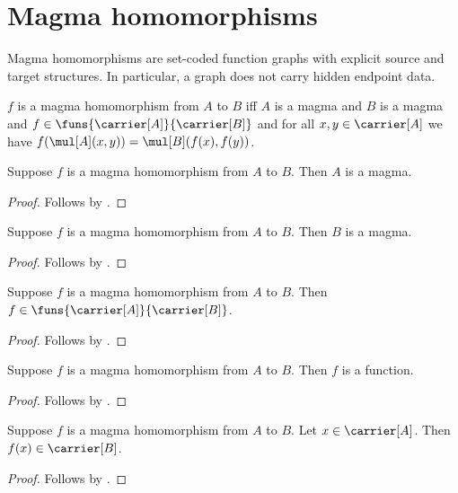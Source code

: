 

\section{Magma homomorphisms}

Magma homomorphisms are set-coded function graphs with explicit source and
target structures.  In particular, a graph does not carry hidden endpoint
data.

\begin{definition}\label{magma_hom}
    $f$ is a magma homomorphism from $A$ to $B$ iff
        $A$ is a magma and $B$ is a magma and
        $f\in\funs{\carrier[A]}{\carrier[B]}$ and
        for all $x,y\in\carrier[A]$ we have
            $f(\mul[A](x,y))=\mul[B](f(x),f(y))$.
\end{definition}

\begin{proposition}\label{magma_hom_source_magma}
    Suppose $f$ is a magma homomorphism from $A$ to $B$.
    Then $A$ is a magma.
\end{proposition}
\begin{proof}
    Follows by .
\end{proof}

\begin{proposition}\label{magma_hom_target_magma}
    Suppose $f$ is a magma homomorphism from $A$ to $B$.
    Then $B$ is a magma.
\end{proposition}
\begin{proof}
    Follows by .
\end{proof}

\begin{proposition}\label{magma_hom_type}
    Suppose $f$ is a magma homomorphism from $A$ to $B$.
    Then $f\in\funs{\carrier[A]}{\carrier[B]}$.
\end{proposition}
\begin{proof}
    Follows by .
\end{proof}

\begin{corollary}\label{magma_hom_is_function}
    Suppose $f$ is a magma homomorphism from $A$ to $B$.
    Then $f$ is a function.
\end{corollary}
\begin{proof}
    Follows by .
\end{proof}

\begin{corollary}\label{magma_hom_apply_type}
    Suppose $f$ is a magma homomorphism from $A$ to $B$.
    Let $x\in\carrier[A]$.
    Then $f(x)\in\carrier[B]$.
\end{corollary}
\begin{proof}
    Follows by .
\end{proof}

